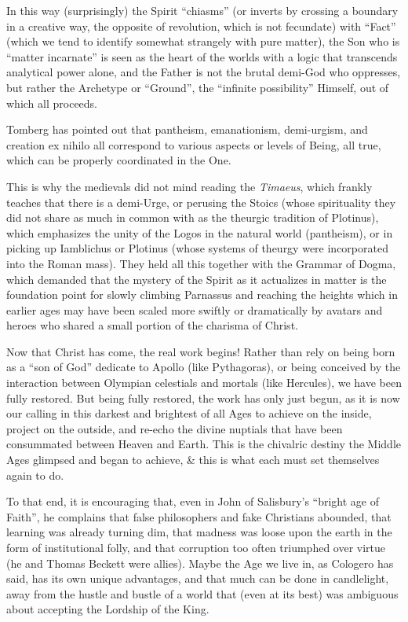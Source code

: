 In this way (surprisingly) the Spirit ``chiasms'' (or inverts by crossing a boundary in a creative way, the opposite of revolution, which is not fecundate) with ``Fact'' (which we tend to identify somewhat strangely with pure matter), the Son who is ``matter incarnate'' is seen as the heart of the worlds with a logic that transcends analytical power alone, and the Father is not the brutal demi-God who oppresses, but rather the Archetype or ``Ground'', the ``infinite possibility'' Himself, out of which all proceeds.

Tomberg has pointed out that pantheism, emanationism, demi-urgism, and creation ex nihilo all correspond to various aspects or levels of Being, all true, which can be properly coordinated in the One.

This is why the medievals did not mind reading the \emph{Timaeus}, which frankly teaches that there is a demi-Urge, or perusing the Stoics (whose spirituality they did not share as much in common with as the theurgic tradition of Plotinus), which emphasizes the unity of the Logos in the natural world (pantheism), or in picking up Iamblichus or Plotinus (whose systems of theurgy were incorporated into the Roman mass). They held all this together with the Grammar of Dogma, which demanded that the mystery of the Spirit as it actualizes in matter is the foundation point for slowly climbing Parnassus and reaching the heights which in earlier ages may have been scaled more swiftly or dramatically by avatars and heroes who shared a small portion of the charisma of Christ.

Now that Christ has come, the real work begins! Rather than rely on being born as a ``son of God'' dedicate to Apollo (like Pythagoras), or being conceived by the interaction between Olympian celestials and mortals (like Hercules), we have been fully restored. But being fully restored, the work has only just begun, as it is now our calling in this darkest and brightest of all Ages to achieve on the inside, project on the outside, and re-echo the divine nuptials that have been consummated between Heaven and Earth. This is the chivalric destiny the Middle Ages glimpsed and began to achieve, \& this is what each must set themselves again to do.

To that end, it is encouraging that, even in John of Salisbury's ``bright age of Faith'', he complains that false philosophers and fake Christians abounded, that learning was already turning dim, that madness was loose upon the earth in the form of institutional folly, and that corruption too often triumphed over virtue (he and Thomas Beckett were allies). Maybe the Age we live in, as Cologero has said, has its own unique advantages, and that much can be done in candlelight, away from the hustle and bustle of a world that (even at its best) was ambiguous about accepting the Lordship of the King.


